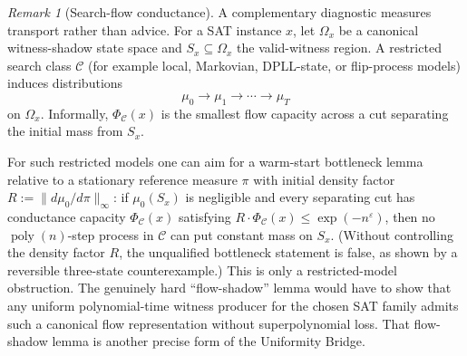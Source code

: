 \documentclass[aps,prd,twocolumn,superscriptaddress,nofootinbib]{revtex4-2}
\theoremstyle{definition}
\theoremstyle{remark}
\newtheorem{remark}[theorem]{Remark}
\DeclareMathOperator{\poly}{poly}
\begin{document}
\begin{remark}[Search-flow conductance]\label{rem:search-flow-conductance}
A complementary diagnostic measures transport rather than advice.  For a SAT
instance $x$, let $\Omega_x$ be a canonical witness-shadow state space and
$S_x\subseteq\Omega_x$ the valid-witness region.  A restricted search class
$\mathcal{C}$ (for example local, Markovian, DPLL-state, or flip-process
models) induces distributions
\[
\mu_0 \to \mu_1 \to \cdots \to \mu_T
\]
on $\Omega_x$.  Informally, $\Phi_{\mathcal{C}}(x)$ is the smallest flow
capacity across a cut separating the initial mass from $S_x$.

For such restricted models one can aim for a warm-start bottleneck lemma relative to a stationary reference measure $\pi$ with initial density factor $R := \|d\mu_0/d\pi\|_\infty$:
if $\mu_0(S_x)$ is negligible and every separating cut has conductance capacity
$\Phi_{\mathcal{C}}(x)$ satisfying $R \cdot \Phi_{\mathcal{C}}(x)\leq \exp(-n^\varepsilon)$, then no
$\poly(n)$-step process in $\mathcal{C}$ can put constant mass on $S_x$. (Without controlling the density factor $R$, the unqualified bottleneck statement is false, as shown by a reversible three-state counterexample.)
This is only a restricted-model obstruction.  The genuinely hard
``flow-shadow'' lemma would have to show that any uniform polynomial-time
witness producer for the chosen SAT family admits such a canonical flow
representation without superpolynomial loss.  That flow-shadow lemma is
another precise form of the Uniformity Bridge.
\end{remark}
\end{document}
